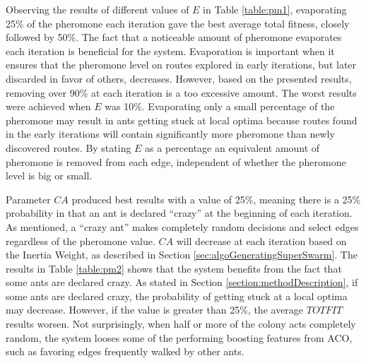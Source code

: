 

Observing the results of different values of $E$ in Table \vref{table:pm1}, evaporating 25\% of the pheromone each iteration gave the best average total fitness, closely followed by 50\%. The fact that a noticeable amount of pheromone evaporates each iteration is beneficial for the system. Evaporation is important when it ensures that the pheromone level on routes explored in early iterations, but later discarded in favor of others, decreases. However, based on the presented results, removing over 90\% at each iteration is a too excessive amount. The worst results were achieved when $E$ was 10\%. Evaporating only a small percentage of the pheromone may result in ants getting stuck at local optima because routes found in the early iterations will contain significantly more pheromone than newly discovered routes. By stating $E$ as a percentage an equivalent amount of pheromone is removed from each edge, independent of whether the pheromone level is big or small. 

Parameter $CA$ produced best results with a value of 25\%, meaning there is a 25\% probability in that an ant is declared ``crazy'' at the beginning of each iteration. As mentioned, a ``crazy ant'' makes completely random decisions and select edges regardless of the pheromone value. $CA$ will decrease at each iteration based on the Inertia Weight, as described in Section \vref{sec:algoGeneratingSuperSwarm}. The results in Table \vref{table:pm2} shows that the system benefits from the fact that some ants are declared crazy. As stated in Section \vref{section:methodDescription}, if some ants are declared crazy, the probability of getting stuck at a local optima may decrease. However, if the value is greater than 25\%, the average $TOTFIT$ results worsen. Not surprisingly, when half or more of the colony acts completely random, the system looses some of the performing boosting features from ACO, such as favoring edges frequently walked by other ants. 

